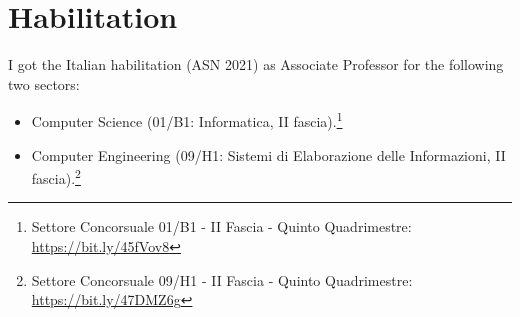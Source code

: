 \documentclass[a4paper,8pt]{article} %
\begin{document}
\section{Habilitation}


I got the Italian habilitation (ASN 2021) %
as Associate Professor for the following two sectors:

\begin{itemize}
	\item Computer Science (01/B1: Informatica, II fascia).\footnote{Settore Concorsuale 01/B1 - II Fascia - Quinto Quadrimestre: \url{https://bit.ly/45fVov8}}
	\item Computer Engineering (09/H1: Sistemi di Elaborazione delle Informazioni, II fascia).\footnote{Settore Concorsuale 09/H1 - II Fascia - Quinto Quadrimestre: \url{https://bit.ly/47DMZ6g}}
\end{itemize}
\end{document}
